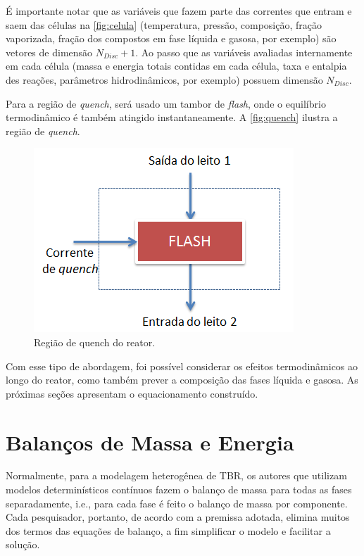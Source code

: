 
É importante notar que as variáveis que fazem parte das correntes que
entram e saem das células na \autoref{fig:celula} (temperatura,
pressão, composição, fração vaporizada, fração dos compostos em fase líquida e
gasosa, por exemplo) são vetores de dimensão $N_{Disc}+1$.
Ao passo que as variáveis avaliadas internamente em cada célula (massa e energia
totais contidas em cada célula, taxa e entalpia des reações, parâmetros
hidrodinâmicos, por exemplo) possuem dimensão $N_{Disc}$.

Para a região de \emph{quench}, será usado um tambor de \emph{flash}, onde o
equilíbrio termodinâmico é também atingido instantaneamente. A
\autoref{fig:quench} ilustra a região de \emph{quench}.

 \begin{figure}[htb]
 \centering \includegraphics[scale=0.75]{images/Chap3/quench.png}
 \caption{Região de quench do reator.}
 \label{fig:quench}
 \end{figure}

Com esse tipo de abordagem, foi possível considerar os efeitos termodinâmicos
ao longo do reator, como também prever a composição das fases líquida e
gasosa. As próximas seções apresentam o equacionamento construído.

\section{Balanços de Massa e Energia} \label{sec:balancomassaenergia}

Normalmente, para a modelagem heterogênea de TBR, os autores que
utilizam modelos determinísticos contínuos fazem o balanço de massa para todas as
fases separadamente, i.e., para cada fase é feito o balanço de massa por
componente. %
Cada pesquisador, portanto, de acordo com a premissa adotada, elimina muitos dos
termos das equações de balanço, a fim simplificar o modelo e facilitar a
solução. 


